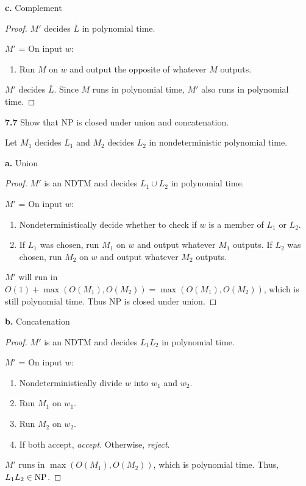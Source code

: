 \textbf{c.} Complement

\begin{mdframed}
\begin{proof}
$M'$ decides $\overline{L}$ in polynomial time.

\medskip
$M'$ = On input $w$:
\begin{enumerate}
\item Run $M$ on $w$ and output the opposite of whatever $M$ outputs.
\end{enumerate}

$M'$ decides $\overline{L}$. Since $M$ runs in polynomial time, $M'$ also runs in polynomial time.
\end{proof}
\end{mdframed}

\textbf{7.7} Show that NP is closed under union and concatenation.
\label{exe:NP_CLOSURE}

\begin{mdframed}
Let $M_1$ decides $L_1$ and $M_2$ decides $L_2$ in nondeterministic polynomial time.
\end{mdframed}

\textbf{a.} Union
\begin{mdframed}
\begin{proof}
$M'$ is an NDTM and decides $L_1 \cup L_2$ in polynomial time.

\medskip
$M'$ = On input $w$:
\begin{enumerate}
\item Nondeterministically decide whether to check if $w$ is a member of $L_1$ or $L_2$.
\item If $L_1$ was chosen, run $M_1$ on $w$ and output whatever $M_1$ outputs. If $L_2$ was chosen, run $M_2$ on $w$ and output whatever $M_2$ outputs.
\end{enumerate}

$M'$ will run in $O(1) + \max(O(M_1), O(M_2)) = \max(O(M_1), O(M_2))$, which is still polynomial time. Thus NP is closed under union.
\end{proof}
\end{mdframed}

\textbf{b.} Concatenation

\begin{mdframed}
\begin{proof}
$M'$ is an NDTM and decides $L_1L_2$ in polynomial time.

\medskip
$M'$ = On input $w$:
\begin{enumerate}
\item Nondeterministically divide $w$ into $w_1$ and $w_2$.
\item Run $M_1$ on $w_1$.
\item Run $M_2$ on $w_2$.
\item If both accept, \textit{accept}. Otherwise, \textit{reject}.
\end{enumerate}
$M'$ runs in $\max(O(M_1), O(M_2))$, which is polynomial time. Thus, $L_1 L_2\in \text{NP}$.
\end{proof}
\end{mdframed}

